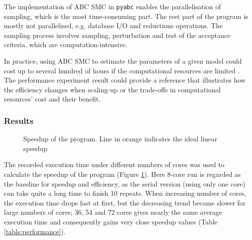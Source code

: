 The implementation of ABC SMC in \verb|pyabc| enables the parallelisation of sampling, which is the most time-consuming part. The rest part of the program is mostly not parallelised, e.g. database I/O and reductions operations. The sampling process involves sampling, perturbation and test of the acceptance criteria, which are computation-intensive.

In practice, using ABC SMC to estimate the parameters of a given model could cost up to several hundred of hours if the computational resources are limited \cite{ref:compare}. The performance experiment result could provide a reference that illustrates how the efficiency changes when scaling-up or the trade-offs in computational resources' cost and their benefit.

\subsubsection{Results}




\begin{figure}[h]
    \begin{center}
    \end{center}

    \caption[Speedup of the program]{Speedup of the program. Line in orange indicates the ideal linear speedup}
    \label{fig:speedup}
\end{figure}

The recorded execution time under different numbers of cores was used to calculate the speedup of the program (Figure \ref{fig:speedup}). Here 8-core run is regarded as the baseline for speedup and efficiency, as the serial version (using only one core) can take quite a long time to finish 10 repeats. When increasing number of cores, the execution time drops fast at first, but the decreasing trend became slower for large numbers of cores; 36, 54 and 72 cores gives nearly the same average execution time and consequently gains very close speedup values (Table \ref{table:performance}).

